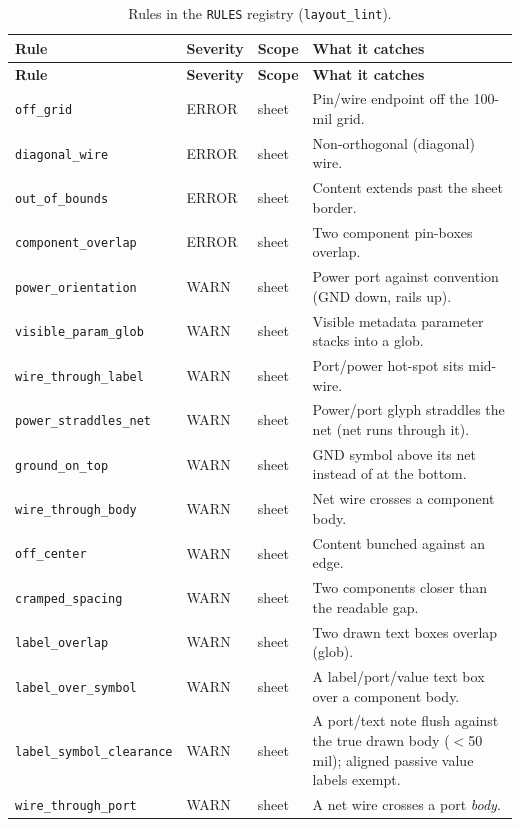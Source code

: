 \documentclass[11pt]{article}
\newcommand{\mod}[1]{\texttt{#1}}
\begin{document}
\begin{longtable}{p{} p{} p{} p{}}
\caption{Rules in the \texttt{RULES} registry (\mod{layout\_lint}).}\label{tab:rules}\\
\toprule
\textbf{Rule} & \textbf{Severity} & \textbf{Scope} & \textbf{What it catches}\\
\midrule
\endfirsthead
\toprule
\textbf{Rule} & \textbf{Severity} & \textbf{Scope} & \textbf{What it catches}\\
\midrule
\endhead
\texttt{off\_grid} & ERROR & sheet & Pin/wire endpoint off the 100-mil grid.\\
\texttt{diagonal\_wire} & ERROR & sheet & Non-orthogonal (diagonal) wire.\\
\texttt{out\_of\_bounds} & ERROR & sheet & Content extends past the sheet border.\\
\texttt{component\_overlap} & ERROR & sheet & Two component pin-boxes overlap.\\
\texttt{power\_orientation} & WARN & sheet & Power port against convention (GND down, rails up).\\
\texttt{visible\_param\_glob} & WARN & sheet & Visible metadata parameter stacks into a glob.\\
\texttt{wire\_through\_label} & WARN & sheet & Port/power hot-spot sits mid-wire.\\
\texttt{power\_straddles\_net} & WARN & sheet & Power/port glyph straddles the net (net runs through it).\\
\texttt{ground\_on\_top} & WARN & sheet & GND symbol above its net instead of at the bottom.\\
\texttt{wire\_through\_body} & WARN & sheet & Net wire crosses a component body.\\
\texttt{off\_center} & WARN & sheet & Content bunched against an edge.\\
\texttt{cramped\_spacing} & WARN & sheet & Two components closer than the readable gap.\\
\texttt{label\_overlap} & WARN & sheet & Two drawn text boxes overlap (glob).\\
\texttt{label\_over\_symbol} & WARN & sheet & A label/port/value text box over a component body.\\
\texttt{label\_symbol\_clearance} & WARN & sheet & A port/text note flush against the true drawn body ($<$50 mil); aligned passive value labels exempt.\\
\texttt{wire\_through\_port} & WARN & sheet & A net wire crosses a port \emph{body}.\\

\end{longtable}
\end{document}

